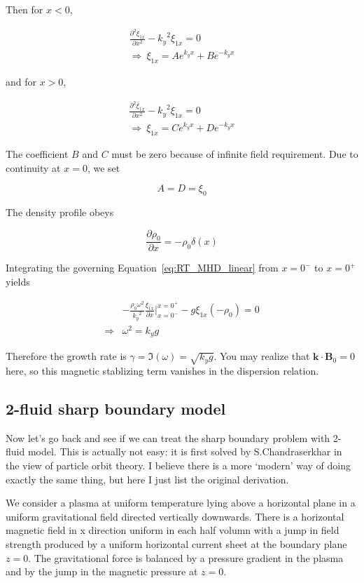 \documentclass[
  notoc %
]{tufte-book}
\begin{document}
Then for \(x<0\),

\[
\begin{aligned}
\frac{\partial^2 \xi_{1x}}{\partial x^2} -{k_y}^2 \xi_{1x} = 0 \\
\Rightarrow\ \xi_{1x}=Ae^{k_y x} + Be^{-k_y x}
\end{aligned}
\]

and for \(x>0\),

\[
\begin{aligned}
\frac{\partial^2 \xi_{1x}}{\partial x^2} -{k_y}^2 \xi_{1x} = 0 \\
\Rightarrow\ \xi_{1x}=Ce^{k_y x} + De^{-k_y x}
\end{aligned}
\]

The coefficient \(B\) and \(C\) must be zero because of infinite field
requirement. Due to continuity at \(x=0\), we set

\[
A = D = \xi_0
\]

The density profile obeys

\[
\frac{\partial \rho_0}{\partial x}=-\rho_0\delta(x)
\]

Integrating the governing Equation~\ref{eq:RT_MHD_linear} from \(x=0^-\)
to \(x=0^+\) yields

\[
\begin{aligned}
&-\frac{\rho_0 \omega^2}{{k_y}^2}\frac{\xi_{1x}}{\partial x}\bigg|_{x=0^-}^{x=0^+} - g\xi_{1x}(-\rho_0)=0 \\
\Rightarrow &\omega^2=k_y g
\end{aligned}
\]

Therefore the growth rate is \(\gamma=\Im(\omega)=\sqrt{k_y g}\). You
may realize that \(\mathbf{k}\cdot\mathbf{B}_0=0\) here, so this
magnetic stablizing term vanishes in the dispersion relation.

\hypertarget{fluid-sharp-boundary-model}{%
\subsection{2-fluid sharp boundary
model}\label{fluid-sharp-boundary-model}}

Now let's go back and see if we can treat the sharp boundary problem
with 2-fluid model. This is actually not easy: it is first solved by
S.Chandraserkhar in the view of particle orbit theory. I believe there
is a more `modern' way of doing exactly the same thing, but here I just
list the original derivation.

We consider a plasma at uniform temperature lying above a horizontal
plane in a uniform gravitational field directed vertically downwards.
There is a horizontal magnetic field in x direction uniform in each half
volumn with a jump in field strength produced by a uniform horizontal
current sheet at the boundary plane \(z=0\). The gravitational force is
balanced by a pressure gradient in the plasma and by the jump in the
magnetic pressure at \(z=0\).
\end{document}
